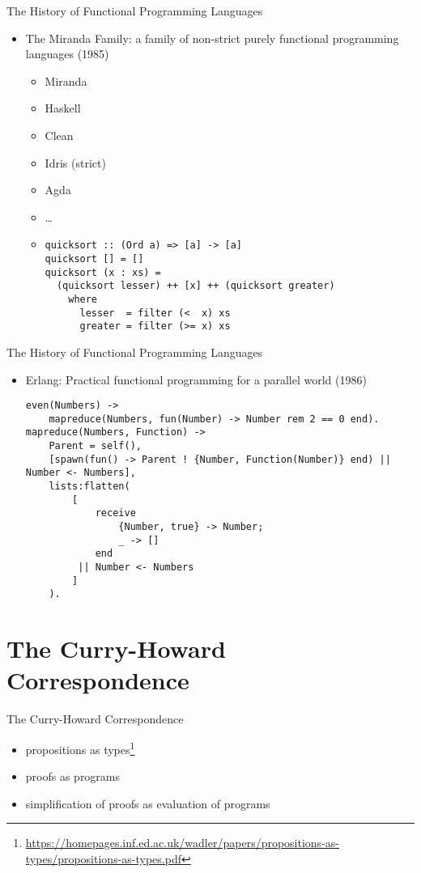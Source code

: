 \documentclass{beamer}
\begin{document}
\begin{frame}[fragile]{The History of Functional Programming Languages}
\begin{itemize}\item
The Miranda Family: a family of non-strict purely functional programming languages (1985)

\begin{itemize}
    \item Miranda
    \item Haskell
    \item Clean
    \item Idris (strict)
    \item Agda
    \item \ldots
\item \begin{verbatim}
quicksort :: (Ord a) => [a] -> [a]
quicksort [] = []
quicksort (x : xs) =
  (quicksort lesser) ++ [x] ++ (quicksort greater)
    where
      lesser  = filter (<  x) xs
      greater = filter (>= x) xs
\end{verbatim}
\end{itemize}

\end{itemize}
\end{frame}

\begin{frame}[fragile]{The History of Functional Programming Languages}
\begin{itemize}\item
Erlang: Practical functional programming for a parallel world (1986)
\begin{verbatim}
even(Numbers) ->
    mapreduce(Numbers, fun(Number) -> Number rem 2 == 0 end).
mapreduce(Numbers, Function) ->
    Parent = self(),
    [spawn(fun() -> Parent ! {Number, Function(Number)} end) || Number <- Numbers],
    lists:flatten(
        [
            receive
                {Number, true} -> Number;
                _ -> []
            end
         || Number <- Numbers
        ]
    ).
\end{verbatim}
\end{itemize}
\end{frame}

\section{The Curry-Howard Correspondence}

\begin{frame}{The Curry-Howard Correspondence}
\begin{itemize}
    \item propositions as types\footnote{{\url{https://homepages.inf.ed.ac.uk/wadler/papers/propositions-as-types/propositions-as-types.pdf}}}
    \item proofs as programs
    \item simplification of proofs as evaluation of programs
\end{itemize}
\end{frame}
\end{document}
